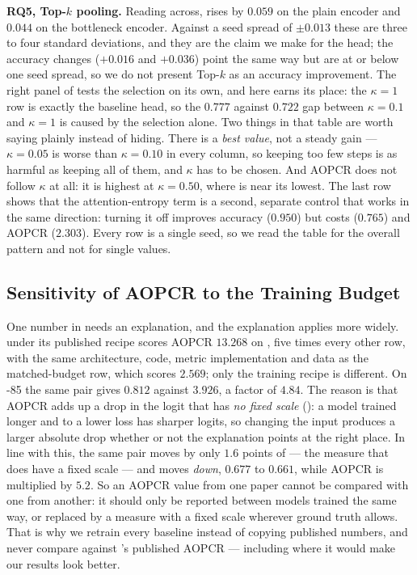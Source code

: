 \textbf{RQ5, \mbox{Top-$k$} pooling.} Reading across, \ndcg{} rises by $0.059$ on the plain encoder
and $0.044$ on the bottleneck encoder. Against a \ndcg{} seed spread of $\pm 0.013$ these are three
to four standard deviations, and they are the claim we make for the head; the accuracy changes
($+0.016$ and $+0.036$) point the same way but are at or below one seed spread, so we do not present
\mbox{Top-$k$} as an accuracy improvement. The right panel of  tests the selection
on its own, and here  earns its place: the $\kappa = 1$ row is exactly the baseline
head, so the $0.777$ against $0.722$ gap between $\kappa = 0.1$ and $\kappa = 1$ is caused by the
selection alone. Two things in that table are worth saying plainly instead of hiding. There is a
\emph{best value}, not a steady gain --- $\kappa = 0.05$ is worse than $\kappa = 0.10$ in every
column, so keeping too few steps is as harmful as keeping all of them, and $\kappa$ has to be chosen.
And AOPCR does not follow $\kappa$ at all: it is highest at $\kappa = 0.50$, where \ndcg{} is near its
lowest. The last row shows that the attention-entropy term is a second, separate control that works in
the same direction: turning it off improves accuracy ($0.950$) but costs \ndcg{} ($0.765$) and AOPCR
($2.303$). Every row is a single seed, so we read the table for the overall pattern and not for single
values.

\subsection{Sensitivity of AOPCR to the Training Budget}
\label{sec:res:aopcr}

One number in  needs an explanation, and the explanation applies more widely.
\millet{} under its published recipe scores AOPCR $13.268$ on \webtraffic{}, five times every other
row, with the same architecture, code, metric implementation and data as the matched-budget
\millet{} row, which scores $2.569$; only the training recipe is different. On \ucr{}-85 the same
pair gives $0.812$ against $3.926$, a factor of $4.84$. The reason is that AOPCR adds up a drop in
the logit that has \emph{no fixed scale} (): a model trained longer and to a lower
loss has sharper logits, so changing the input produces a larger absolute drop whether or not the
explanation points at the right place. In line with this, the same pair moves by only $1.6$ points of
\ndcg{} --- the measure that does have a fixed scale --- and moves \emph{down}, $0.677$ to $0.661$,
while AOPCR is multiplied by $5.2$. So an AOPCR value from one paper cannot be compared with one from
another: it should only be reported between models trained the same way, or replaced by a measure
with a fixed scale wherever ground truth allows. That is why we retrain every baseline instead of
copying published numbers, and never compare against \millet{}'s published AOPCR --- including where
it would make our results look better.
